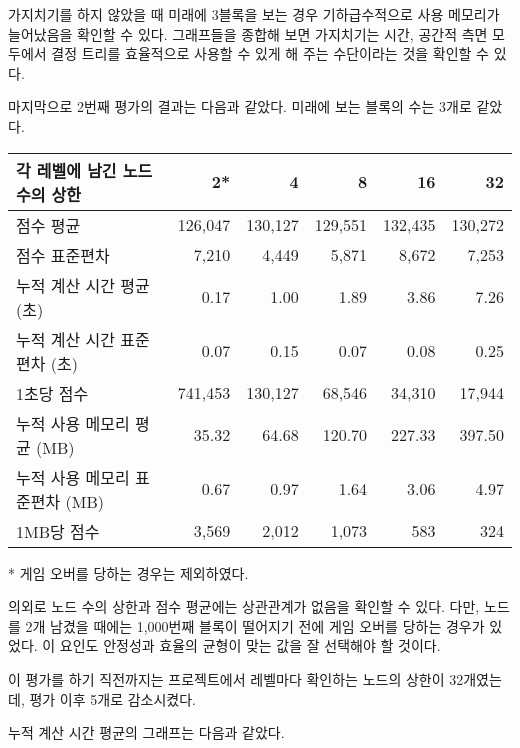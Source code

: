 가지치기를 하지 않았을 때 미래에 3블록을 보는 경우 기하급수적으로 사용 메모리가 늘어났음을
확인할 수 있다. 그래프들을 종합해 보면 가지치기는 시간, 공간적 측면 모두에서 결정 트리를
효율적으로 사용할 수 있게 해 주는 수단이라는 것을 확인할 수 있다.

마지막으로 2번째 평가의 결과는 다음과 같았다. 미래에 보는 블록의 수는 3개로 같았다.
\begin{center}
    \begin{tabular}{l|r|r|r|r|r}
        각 레벨에 남긴 노드 수의 상한 & 2* & 4 & 8 & 16 & 32 \\
        \hline
        점수 평균 & 126,047 & 130,127 & 129,551 & 132,435 & 130,272 \\
        점수 표준편차 & 7,210 & 4,449 & 5,871 & 8,672 & 7,253 \\
        \hline
        누적 계산 시간 평균 (초) & 0.17 & 1.00 & 1.89 & 3.86 & 7.26 \\
        누적 계산 시간 표준편차 (초) & 0.07 & 0.15 & 0.07 & 0.08 & 0.25 \\
        1초당 점수 & 741,453 & 130,127 & 68,546 & 34,310 & 17,944 \\
        \hline
        누적 사용 메모리 평균 (MB) & 35.32 & 64.68 & 120.70 & 227.33 & 397.50 \\
        누적 사용 메모리 표준편차 (MB) & 0.67 & 0.97 & 1.64 & 3.06 & 4.97 \\
        1MB당 점수 & 3,569 & 2,012 & 1,073 & 583 & 324 \\
    \end{tabular}
\end{center}
* 게임 오버를 당하는 경우는 제외하였다.

의외로 노드 수의 상한과 점수 평균에는 상관관계가 없음을 확인할 수 있다. 다만, 노드를 2개
남겼을 때에는 1,000번째 블록이 떨어지기 전에 게임 오버를 당하는 경우가 있었다. 이 요인도
안정성과 효율의 균형이 맞는 값을 잘 선택해야 할 것이다.

이 평가를 하기 직전까지는 프로젝트에서 레벨마다 확인하는 노드의 상한이 32개였는데,
평가 이후 5개로 감소시켰다.

누적 계산 시간 평균의 그래프는 다음과 같았다.

\begin{center}
\end{center}

